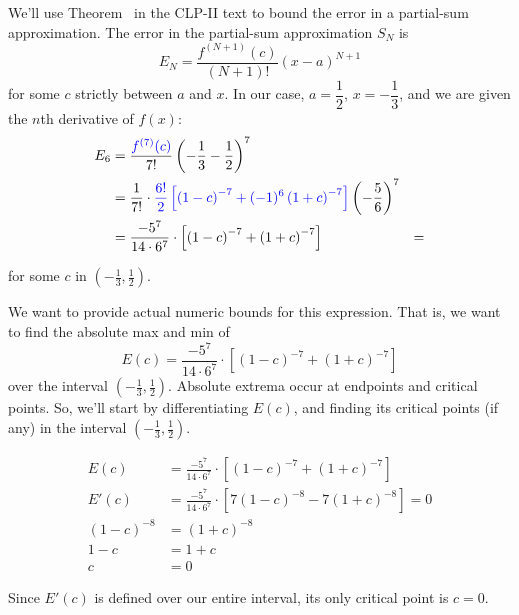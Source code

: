 \begin{solution}
	We'll use  Theorem~ in the CLP-II text to bound the error in a partial-sum approximation. The error in the partial-sum approximation $S_N$ is
\[E_N=\frac{f^{(N+1)}(c)}{(N+1)!}(x-a)^{N+1}\]
for some $c$ strictly between $a$ and $x$. In our case, $a=\dfrac12$, $x=-\dfrac1{3}$, and we are given the $n$th derivative of $f(x)$:
\begin{align*}E_6&=\frac{\textcolor{blue}{f^{(7)}(c)}}{7!}\left(-\frac13-\frac12 \right)^{7}\\
&=\frac{1}{7!}\cdot\textcolor{blue}{\frac{6!}{2}\left[\left(1-c\right)^{-7}+(-1)^{6}\left(1+c\right)^{-7} \right]}\left(-\frac56 \right)^7\\
&=\frac{-5^7}{14\cdot 6^7}\cdot\left[\left(1-c\right)^{-7}+\left(1+c\right)^{-7} \right]
&=\end{align*}


for some $c$ in $(-\frac13,\frac1{2})$.

We want to provide actual numeric bounds for this expression. That is, we want to find the absolute max and min of
\[E(c)=\frac{-5^7}{14\cdot 6^7}\cdot\left[\left(1-c\right)^{-7}+\left(1+c\right)^{-7} \right]\]
over the interval $\left( -\frac{1}{3},\frac{1}{2}\right)$. Absolute extrema occur at endpoints and critical points. So, we'll start by differentiating $E(c)$, and finding its critical points (if any) in  the interval $\left( -\frac{1}{3},\frac{1}{2}\right)$.

\begin{align*}
E(c)&=\frac{-5^7}{14\cdot 6^7}\cdot\left[\left(1-c\right)^{-7}+\left(1+c\right)^{-7} \right]\\
E'(c)&=\frac{-5^7}{14\cdot 6^7}\cdot\left[7\left(1-c\right)^{-8}-7\left(1+c\right)^{-8} \right]=0\\
\left(1-c\right)^{-8}&=\left(1+c\right)^{-8}\\
1-c&=1+c\\
c&=0
\end{align*}

Since $E'(c)$ is defined over our entire interval, its only critical point is $c=0$.


\end{solution}
